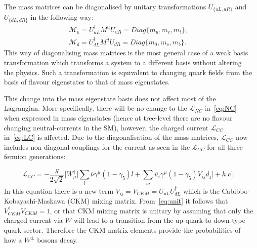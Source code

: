  The mass matrices can be diagonalised by unitary transformations $U_{\{uL,uR\}}$ and $ U_{\{dL,dR\}}$ in the following way:
\begin{equation}
\begin{split}
	\mathcal{M}_{u} = U^{\dagger}_{uL}M^{u}U_{uR} = Diag\{m_{u},m_{c},m_{t}\},
\\
	\mathcal{M}_{d} = U^{\dagger}_{dL}M^{d}U_{dR} = Diag\{m_{d},m_{s},m_{b}\}.
\end{split}
	\label{eq:unit}
\end{equation}
This way of diagonalising mass matrices is the most general case of a weak basis transformation which transforms a system to a different basis without altering the physics. Such a transformation is equivalent to changing quark fields from the basis of flavour eigenstates to that of mass eigenstates.
%

This change into the mass eigenstate basis does not affect most of the Lagrangian. More specifically, there will be no change to the $\mathcal{L}_{NC}$ in~\autoref{eq:NC} when expressed in mass eigenstates (hence at tree-level there are no flavour changing neutral-currents in the \gls{SM}), however, the charged current $\mathcal{L}_{CC}$ in~\autoref{eq:LC} is affected. Due to the diagonalisation of the mass matrices, $\mathcal{L}_{CC}$ now includes non diagonal couplings for the current as seen in the $\mathcal{L}_{CC}$ for all three fermion generations:

\begin{equation}
	\mathcal{L}_{CC}= - \frac{g}{2\sqrt{2}}\Big[W^{\dagger}_{\mu}\big[\sum_{l}\overline{\nu}\gamma^{\mu}(1-\gamma_{5})l + \sum_{ij}\overline{u_{i}}\gamma^{\mu}(1-\gamma_{5})V_{ij}d_{j}\big] + h.c\Big]. 
\label{eq:LC}
\end{equation}
In this equation there is a new term $V_{ij}=V_{CKM}= U_{uL} U_{dL}^\dag$ which is the Cabibbo-Kobayashi-Maskawa (CKM)\cite{Cabibbo:1963yz}\cite{Kobayashi:1973fv} mixing matrix. From~\autoref{eq:unit} it follows that $V^{\dagger}_{CKM}V_{CKM}=1$, or that \gls{CKM} mixing matrix is unitary by assuming that only the charged current via $W$ will lead to a transition from the up-quark to down-type quark sector. Therefore the CKM matrix elements provide the probabilities of how a $W^{\pm}$ bosons decay.
 

